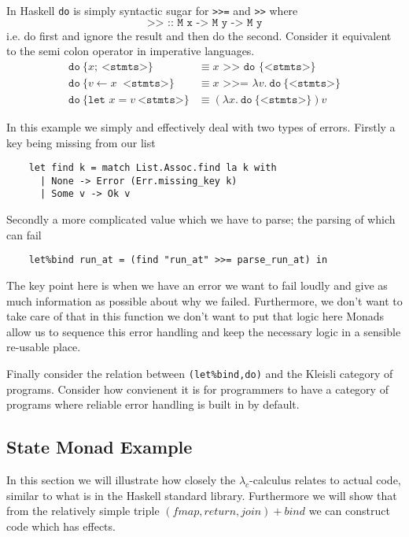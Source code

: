 In Haskell \texttt{do} is simply syntactic sugar for \texttt{>>=} and \texttt{>>} where
\begin{equation}
    \texttt{>> :: M x -> M y -> M y}
\end{equation}
i.e. do first and ignore the result and then do the second.
Consider it equivalent to the semi colon operator in imperative languages.
\begin{align}
    \texttt{do}\ \{ x;\ \texttt{<stmts>} \}
    &\equiv x \texttt{ >> do \{<stmts>\}}
    \\
    \texttt{do}\ \{ v \leftarrow x\ \texttt{ <stmts>}\}
    &\equiv x \texttt{ >>= } \lambda v.\ \texttt{do}\ \{ \texttt{<stmts>} \}
    \\
    \texttt{do}\ \{\texttt{let }x = v\ \texttt{<stmts>}\}
    &\equiv (\lambda x.\ \texttt{do}\ \{ \texttt{<stmts>} \})v
\end{align}

In this example we simply and effectively deal with two types of errors.
Firstly a key being missing from our list
\begin{verbatim}
    let find k = match List.Assoc.find la k with
      | None -> Error (Err.missing_key k)
      | Some v -> Ok v
\end{verbatim}
Secondly a more complicated value which we have to parse;
the parsing of which can fail
\begin{verbatim}
    let%bind run_at = (find "run_at" >>= parse_run_at) in
\end{verbatim}
The key point here is when we have an error we want to fail
loudly and give as much information as possible about why we failed.
Furthermore, we don't want to take care of that in this function
we don't want to put that logic here
Monads allow us to sequence this error handling
and keep the necessary logic in a sensible re-usable place.

Finally consider the relation between
\texttt{(let\%bind,do)} and the Kleisli category of programs.
Consider how convienent it is for programmers to have a category
of programs where reliable error handling is built in by default.

\subsection{State Monad Example}
In this section we will illustrate how closely
the $\lambda_c$-calculus relates to actual code,
similar to what is in the Haskell standard library.
Furthermore we will show that from the relatively
simple triple $(fmap,return,join) + bind$ we can
construct code which has effects.

